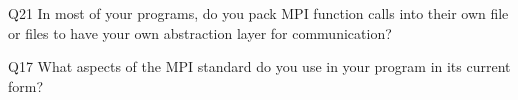 \begin{description}%
\item{Q21} In most of your programs, do you pack MPI function calls into their own file or files to have your own abstraction layer for communication?%
\item{Q17} What aspects of the MPI standard do you use in your program in its current form?%
\end{description}%

